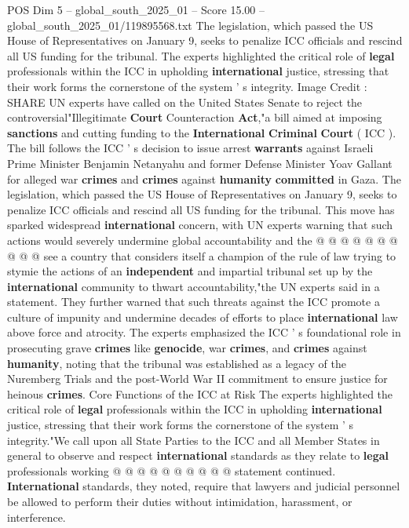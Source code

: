 \begin{textsample}{POS Dim 5 – global\_south\_2025\_01 – Score 15.00 – global\_south\_2025\_01/119895568.txt}  \label{ex:f5_pos_296}
The legislation, which passed the US House of Representatives on January 9, seeks to penalize ICC officials and rescind all US funding for the tribunal.
The experts highlighted the critical role of \textbf{legal} professionals within the ICC in upholding \textbf{international} justice, stressing that their work forms the cornerstone of the system ' s integrity.
Image Credit : SHARE UN experts have called on the United States Senate to reject the controversial"Illegitimate \textbf{Court} Counteraction \textbf{Act},"a bill aimed at imposing \textbf{sanctions} and cutting funding to the \textbf{International} \textbf{Criminal} \textbf{Court} ( ICC ).
The bill follows the ICC ' s decision to issue arrest \textbf{warrants} against Israeli Prime Minister Benjamin Netanyahu and former Defense Minister Yoav Gallant for alleged war \textbf{crimes} and \textbf{crimes} against \textbf{humanity} \textbf{committed} in Gaza.
The legislation, which passed the US House of Representatives on January 9, seeks to penalize ICC officials and rescind all US funding for the tribunal.
This move has sparked widespread \textbf{international} concern, with UN experts warning that such actions would severely undermine global accountability and the @ @ @ @ @ @ @ @ @ @ see a country that considers itself a champion of the rule of law trying to stymie the actions of an \textbf{independent} and impartial tribunal set up by the \textbf{international} community to thwart accountability,"the UN experts said in a statement.
They further warned that such threats against the ICC promote a culture of impunity and undermine decades of efforts to place \textbf{international} law above force and atrocity.
The experts emphasized the ICC ' s foundational role in prosecuting grave \textbf{crimes} like \textbf{genocide}, war \textbf{crimes}, and \textbf{crimes} against \textbf{humanity}, noting that the tribunal was established as a legacy of the Nuremberg Trials and the post-World War II commitment to ensure justice for heinous \textbf{crimes}.
Core Functions of the ICC at Risk The experts highlighted the critical role of \textbf{legal} professionals within the ICC in upholding \textbf{international} justice, stressing that their work forms the cornerstone of the system ' s integrity."We call upon all State Parties to the ICC and all Member States in general to observe and respect \textbf{international} standards as they relate to \textbf{legal} professionals working @ @ @ @ @ @ @ @ @ @ statement continued. \textbf{International} standards, they noted, require that lawyers and judicial personnel be allowed to perform their duties without intimidation, harassment, or interference.

\end{textsample}
